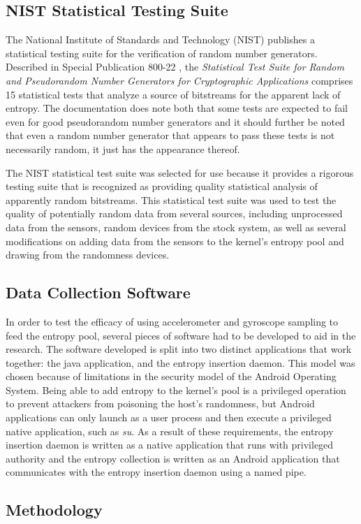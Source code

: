 \subsection{NIST Statistical Testing Suite}

The National Institute of Standards and Technology (NIST) publishes a
statistical testing suite for the verification of random number generators.
Described in Special Publication 800-22 \cite{nist}, the \textit{Statistical
Test Suite for Random and Pseudorandom Number Generators for Cryptographic
Applications} comprises 15 statistical tests that analyze a source of bitstreams
for the apparent lack of entropy. The documentation does note both that some
tests are expected to fail even for good pseudorandom number generators and it
should further be noted that even a random number generator that appears to pass
these tests is not necessarily random, it just has the appearance thereof.

The NIST statistical test suite was selected for use because it provides a
rigorous testing suite that is recognized as providing quality statistical
analysis of apparently random bitstreams. This statistical test suite was used
to test the quality of potentially random data from several sources, including
unprocessed data from the sensors, random devices from the stock system, as well
as several modifications on adding data from the sensors to the kernel's entropy
pool and drawing from the randomness devices.


\subsection{Data Collection Software}

In order to test the efficacy of using accelerometer and gyroscope sampling to
feed the entropy pool, several pieces of software had to be developed to aid in
the research. The software developed is split into two distinct applications
that work together: the java application, and the entropy insertion daemon. This
model was chosen because of limitations in the security model of the Android
Operating System. Being able to add entropy to the kernel's pool is a privileged
operation to prevent attackers from poisoning the host's randomness, but Android
applications can only launch as a user process and then execute a privileged
native application, such as \textit{su}. As a result of these requirements, the
entropy insertion daemon is written as a native application that runs with 
privileged authority and the entropy collection is written as an Android
application that communicates with the entropy insertion daemon using a named
pipe. 

\subsection{Methodology}



